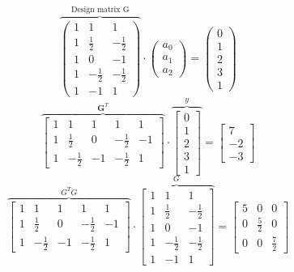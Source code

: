\begin{equation}
\overbrace{\left(\begin{array}{ccc}
1 & 1 & 1 \\
1 & \frac{1}{2} & -\frac{1}{2} \\
1 & 0 & -1 \\
1 & -\frac{1}{2} & -\frac{1}{2} \\
1 & -1 & 1 
\end{array}\right)}^{\text{Design matrix G}} \cdot\left(\begin{array}{l}
a_0 \\
a_1 \\
a_2
\end{array}\right)=\left(\begin{array}{l}
0 \\
1 \\
2 \\
3 \\
1 
\end{array}\right)
\end{equation}
$$
\overbrace{\left[\begin{array}{ccccc}
1 & 1 & 1 & 1 & 1 \\
1 & \frac{1}{2} & 0 & -\frac{1}{2} & -1 \\
1 & -\frac{1}{2} & -1 & -\frac{1}{2} & 1
\end{array}\right]}^{\textbf{G}^T} \cdot \overbrace{\left[\begin{array}{c}
0 \\
1 \\
2 \\
3 \\
1 
\end{array}\right]}^{y} =\left[\begin{array}{c}
7 \\
-2 \\
-3
\end{array}\right]
$$
$$
\overbrace{\left[\begin{array}{ccccc}
1 & 1 & 1 & 1 & 1 \\
1 & \frac{1}{2} & 0 & -\frac{1}{2} & -1 \\
1 & -\frac{1}{2} & -1 & -\frac{1}{2} & 1
\end{array}\right]}^{G^{T}G} \cdot \overbrace{\left[\begin{array}{ccc}
1 & 1 & 1 \\
1 & \frac{1}{2} & -\frac{1}{2} \\
1 & 0 & -1 \\
1 & -\frac{1}{2} & -\frac{1}{2} \\
1 & -1 & 1 
\end{array}\right]}^G=
\left[\begin{array}{ccc}
5 & 0 & 0 \\
0 & \frac{5}{2} & 0 \\
0 & 0 & \frac{7}{2}
\end{array}\right]
$$
